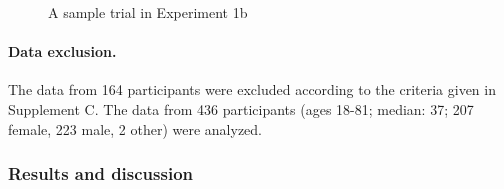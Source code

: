 \documentclass{language}
\newcommand{\6}{\mbox{$[\hspace*{-.6mm}[$}}
\newcommand{\9}{\mbox{$]\hspace*{-.6mm}]$}}
\begin{document}
\begin{figure}[h!]
\begin{center}
\end{center}
\caption{A sample trial in Experiment 1b}\label{fig-trial-exp1b}
\end{figure}

\paragraph{Data exclusion.} The data from 164 participants were excluded according to the criteria given in Supplement C. The data from 436 participants (ages 18-81; median: 37; 207 female, 223 male, 2 other) were analyzed.

\subsubsection{Results and discussion}
\end{document}
